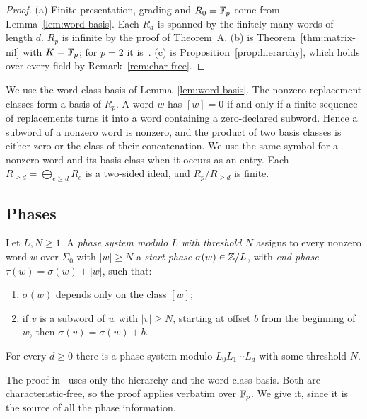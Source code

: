 \begin{proof}
(a) Finite presentation, grading and $R_0=\mathbb F_p$ come from Lemma~\ref{lem:word-basis}. Each $R_d$ is spanned by the
finitely many words of length $d$. $R_p$ is infinite by the proof of Theorem~A. (b) is Theorem~\ref{thm:matrix-nil} with
$K=\mathbb F_p$; for $p=2$ it is~\cite[Theorem~3.7]{OAI247periodic}. (c) is Proposition~\ref{prop:hierarchy}, which holds over every
field by Remark~\ref{rem:char-free}.
\end{proof}

We use the word-class basis of Lemma~\ref{lem:word-basis}. The nonzero replacement classes form a basis of $R_p$. A word
$w$ has $[w]=0$ if and only if a finite sequence of replacements turns it into a word containing a zero-declared subword.
Hence a subword of a nonzero word is nonzero, and the product of two basis classes is either zero or the class of their
concatenation. We use the same symbol for a nonzero word and its basis class when it occurs as an entry. Each
$R_{\geq d}=\bigoplus_{e\geq d}R_e$ is a two-sided ideal, and $R_p/R_{\geq d}$ is finite.

\subsection{Phases}

\begin{definition}\label{def:phase-system}
Let $L,N\geq1$. A \emph{phase system modulo $L$ with threshold $N$} assigns to every nonzero word $w$ over $\Sigma_0$
with $|w|\geq N$ a \emph{start phase} $\sigma(w)\in\mathbb Z/L$, with \emph{end phase} $\tau(w)=\sigma(w)+|w|$, such that:
\begin{enumerate}[label=\textup{(P\arabic*)}]
\item $\sigma(w)$ depends only on the class $[w]$;
\item if $v$ is a subword of $w$ with $|v|\geq N$, starting at offset $b$ from the beginning of $w$, then
$\sigma(v)=\sigma(w)+b$.
\end{enumerate}
\end{definition}

\begin{lemma}\label{lem:det-phases}
For every $d\geq0$ there is a phase system modulo $L_0L_1\cdots L_d$ with some threshold $N$.
\end{lemma}

The proof in~\cite{OAI247rf} uses only the hierarchy and the word-class basis. Both are characteristic-free, so the
proof applies verbatim over $\mathbb F_p$. We give it, since it is the source of all the phase information.


